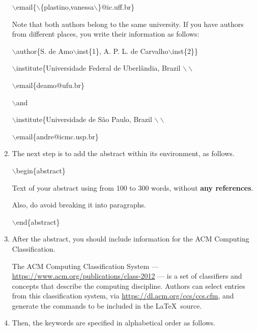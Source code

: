 \documentclass[kdmile,a4paper]{kdmile} %
\newenvironment{latexcode}
{\ttfamily\vspace{0.1in}\setlength{\parindent}{18pt}}
{\vspace{0.1in}}
\begin{document}
\begin{enumerate}
\begin{latexcode}
				$\backslash$email\{$\backslash$\{plastino,vanessa$\backslash$\}@ic.uff.br\}
				
		\end{latexcode}
		
	Note that both authors belong to the same university. If you have authors from different places, you write their information as follows:
		
		\begin{latexcode}		
				$\backslash$author\{S. de Amo$\backslash$inst\{1\}, A. P. L. de Carvalho$\backslash$inst\{2\}\}
				
				$\backslash$institute\{Universidade Federal de Uberl\^andia, Brazil $\backslash\backslash$
				
				$\backslash$email\{deamo@ufu.br\} 
				
				$\backslash$and
				
				$\backslash$institute\{Universidade de S\~ao Paulo, Brazil $\backslash\backslash$
				
				$\backslash$email\{andre@icmc.usp.br\} 
 
		\end{latexcode}

		
	\item The next step is to add the abstract within its environment, as follows.
	
		\begin{latexcode}		
				$\backslash$begin\{abstract\}
				
Text of your abstract using from 100 to 300 words, without \textbf{any references}. 

Also, do avoid breaking it into paragraphs.
				
				$\backslash$end\{abstract\}
		\end{latexcode}
					
	\item After the abstract, you should include information for the ACM Computing Classification.	
	
	The ACM Computing Classification System ---
	\url{https://www.acm.org/publications/class-2012} --- is a set of
	classifiers and concepts that describe the computing
	discipline. Authors can select entries from this classification
	system, via \url{https://dl.acm.org/ccs/ccs.cfm}, and generate the
	commands to be included in the \LaTeX\ source. \\

	

	\item Then, the keywords are specified in alphabetical order as follows.
	

\end{enumerate}
\end{document}
